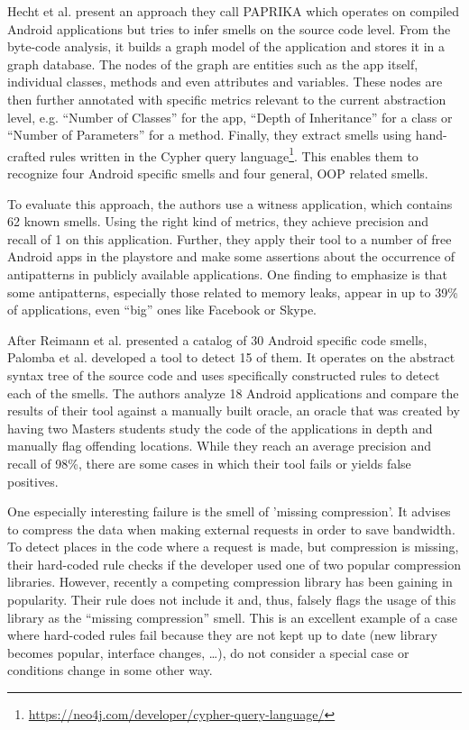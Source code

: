Hecht et al. \cite{hecht2015detecting} present an approach they call PAPRIKA which operates on compiled Android applications but tries to infer smells on the source code level.
From the byte-code analysis, it builds a graph model of the application and stores it in a graph database.
The nodes of the graph are entities such as the app itself, individual classes, methods and even attributes and variables.
These nodes are then further annotated with specific metrics relevant to the current abstraction level, e.g. ``Number of Classes'' for the app, ``Depth of Inheritance'' for a class or ``Number of Parameters'' for a method.
Finally, they extract smells using hand-crafted rules written in the Cypher query language\footnote{\url{https://neo4j.com/developer/cypher-query-language/}}.
This enables them to recognize four Android specific smells and four general, OOP related smells.

To evaluate this approach, the authors use a witness application, which contains 62 known smells.
Using the right kind of metrics, they achieve precision and recall of 1 on this application.
Further, they apply their tool to a number of free Android apps in the playstore and make some assertions about the occurrence of antipatterns in publicly available applications.
One finding to emphasize is that some antipatterns, especially those related to memory leaks, appear in up to 39\% of applications, even ``big'' ones like Facebook or Skype.

After Reimann et al. \cite{reimann2014tool} presented a catalog of 30 Android specific code smells, Palomba et al. \cite{palomba2017lightweight} developed a tool to detect 15 of them.
It operates on the abstract syntax tree of the source code and uses specifically constructed rules to detect each of the smells.
The authors analyze 18 Android applications and compare the results of their tool against a manually built oracle,
an oracle that was created by having two Masters students study the code of the applications in depth and manually flag offending locations.
While they reach an average precision and recall of 98\%, there are some cases in which their tool fails or yields false positives.

One especially interesting failure is the smell of 'missing compression'.
It advises to compress the data when making external requests in order to save bandwidth.
To detect places in the code where a request is made, but compression is missing, their hard-coded rule checks if the developer used one of two popular compression libraries.
However, recently a competing compression library has been gaining in popularity.
Their rule does not include it and, thus, falsely flags the usage of this library as the ``missing compression'' smell.
This is an excellent example of a case where hard-coded rules fail because they are not kept up to date (new library becomes popular, interface changes, \ldots), do not consider a special case or conditions change in some other way.

